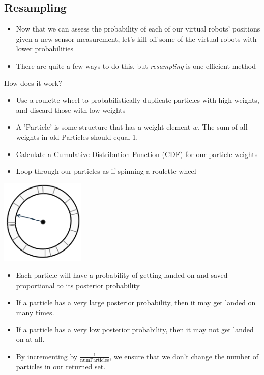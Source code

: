 \documentclass[10pt]{article}
\begin{document}
\subsection*{Resampling}
\begin{itemize}
	\item Now that we can assess the probability of each of our virtual robots' positions given a new sensor measurement, let's kill off some of the virtual robots with lower probabilities
	\item There are quite a few ways to do this, but \textit{resampling} is one efficient method
\end{itemize}
How does it work?
\begin{itemize}
	\item Use a roulette wheel to probabilistically duplicate particles with high weights, and discard those with low weights
	\item A 'Particle' is some structure that has a weight element $w$.  The sum of all weights in old Particles should equal 1.
	\item Calculate a Cumulative Distribution Function (CDF) for our particle weights
	\item Loop through our particles as if spinning a roulette wheel
\end{itemize}
\begin{center} 
	\includegraphics*[width=0.3\textwidth]{L1_12.png} 
\end{center}
\begin{itemize}
	\item Each particle will have a probability of getting landed on and saved proportional to its posterior probability
	\item If a particle has a very large posterior probability, then it may get landed on many times.
	\item If a particle has a very low posterior probability, then it may not get landed on at all.
	\item By incrementing by $\frac{1}{\text{numParticles}}$, we ensure that we don't change the number of particles in our returned set.
\end{itemize}
\end{document}

